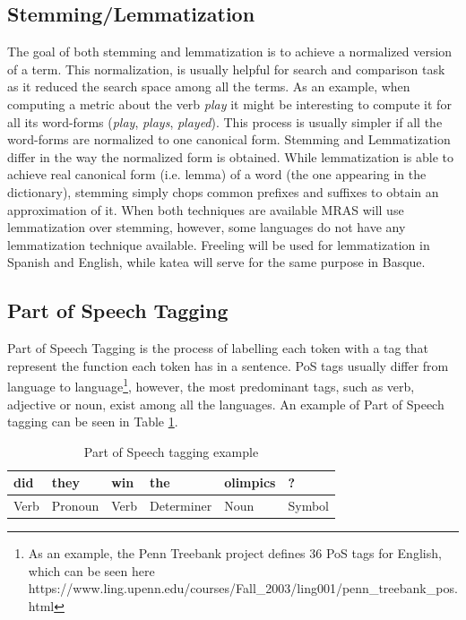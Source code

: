 \documentclass{bsu-ms}
\newcommand{\projectName}{MRAS\xspace}
\begin{document}
\subsection{Stemming/Lemmatization}
The goal of both stemming and lemmatization is to achieve a normalized version of a term. This normalization, is usually helpful for search and comparison task as it reduced the search space among all the terms. As an example, when computing a metric about the verb \emph{play} it might be interesting to compute it for all its word-forms (\emph{play}, \emph{plays}, \emph{played}). This process is usually simpler if all the word-forms are normalized to one canonical form. Stemming and Lemmatization differ in the way the normalized form is obtained. While lemmatization is able to achieve real canonical form (i.e. lemma) of a word (the one appearing in the dictionary), stemming simply chops common prefixes and suffixes to obtain an approximation of it. When both techniques are available \projectName will use lemmatization over stemming, however, some languages do not have any lemmatization technique available. Freeling will be used for lemmatization in Spanish and English, while katea will serve for the same purpose in Basque.




\subsection{Part of Speech Tagging}
Part of Speech Tagging is the process of labelling each token with a tag that represent the function each token has in a sentence. PoS tags usually differ from language to language\footnote{As an example, the Penn Treebank project defines 36 PoS tags for English, which can be seen here https://www.ling.upenn.edu/courses/Fall\_2003/ling001/penn\_treebank\_pos.html}, however, the most predominant tags, such as verb, adjective or noun, exist among all the languages. An example of Part of Speech tagging can be seen in Table \ref{tab:postagging}.



\begin{table}[h]
\centering
\begin{tabular}{|l|l|l|l|l|l|}
\hline
did & they & win & the & olimpics & ? \\ \hline
Verb & Pronoun & Verb & Determiner & Noun & Symbol \\ \hline
\end{tabular}
\caption{Part of Speech tagging example}
\label{tab:postagging}
\end{table}
\end{document}
